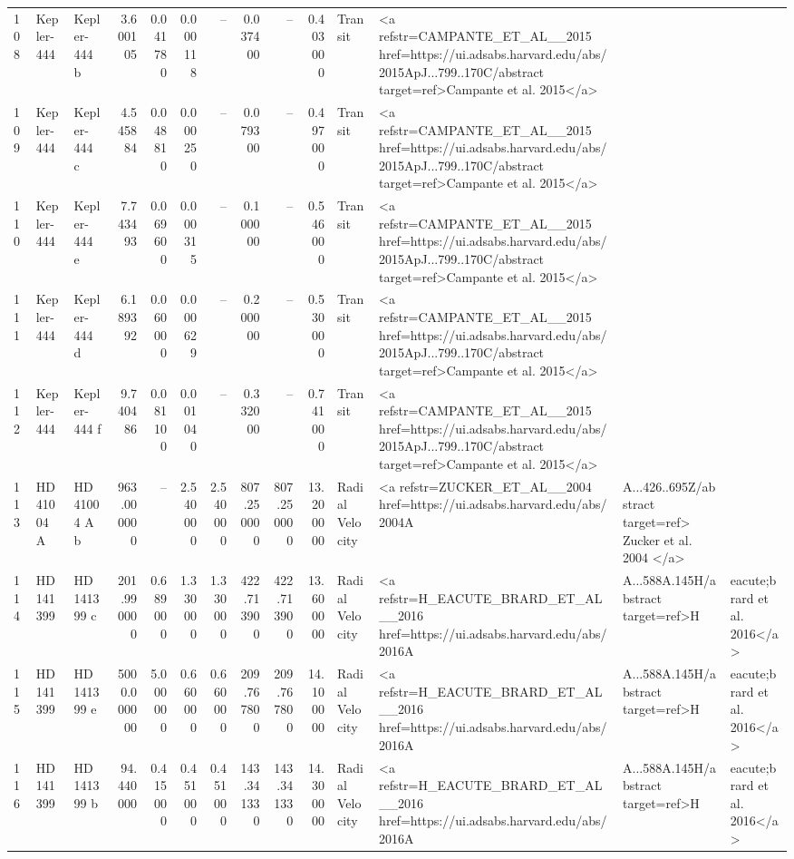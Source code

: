 \begin{tabular}{lllrrrrrrrll}
108 & Kepler-444 & Kepler-444 b & 3.600105 & 0.041780 & 0.000118 & -- & 0.037400 & -- & 0.403000 & Transit & <a refstr=CAMPANTE_ET_AL__2015 href=https://ui.adsabs.harvard.edu/abs/2015ApJ...799..170C/abstract target=ref>Campante et al. 2015</a> \\
109 & Kepler-444 & Kepler-444 c & 4.545884 & 0.048810 & 0.000250 & -- & 0.079300 & -- & 0.497000 & Transit & <a refstr=CAMPANTE_ET_AL__2015 href=https://ui.adsabs.harvard.edu/abs/2015ApJ...799..170C/abstract target=ref>Campante et al. 2015</a> \\
110 & Kepler-444 & Kepler-444 e & 7.743493 & 0.069600 & 0.000315 & -- & 0.100000 & -- & 0.546000 & Transit & <a refstr=CAMPANTE_ET_AL__2015 href=https://ui.adsabs.harvard.edu/abs/2015ApJ...799..170C/abstract target=ref>Campante et al. 2015</a> \\
111 & Kepler-444 & Kepler-444 d & 6.189392 & 0.060000 & 0.000629 & -- & 0.200000 & -- & 0.530000 & Transit & <a refstr=CAMPANTE_ET_AL__2015 href=https://ui.adsabs.harvard.edu/abs/2015ApJ...799..170C/abstract target=ref>Campante et al. 2015</a> \\
112 & Kepler-444 & Kepler-444 f & 9.740486 & 0.081100 & 0.001040 & -- & 0.332000 & -- & 0.741000 & Transit & <a refstr=CAMPANTE_ET_AL__2015 href=https://ui.adsabs.harvard.edu/abs/2015ApJ...799..170C/abstract target=ref>Campante et al. 2015</a> \\
113 & HD 41004 A & HD 41004 A b & 963.000000 & -- & 2.540000 & 2.540000 & 807.250000 & 807.250000 & 13.200000 & Radial Velocity & <a refstr=ZUCKER_ET_AL__2004 href=https://ui.adsabs.harvard.edu/abs/2004A&A...426..695Z/abstract target=ref> Zucker et al. 2004 </a> \\
114 & HD 141399 & HD 141399 c & 201.990000 & 0.689000 & 1.330000 & 1.330000 & 422.713900 & 422.713900 & 13.600000 & Radial Velocity & <a refstr=H_EACUTE_BRARD_ET_AL__2016 href=https://ui.adsabs.harvard.edu/abs/2016A&A...588A.145H/abstract target=ref>H&eacute;brard et al. 2016</a> \\
115 & HD 141399 & HD 141399 e & 5000.000000 & 5.000000 & 0.660000 & 0.660000 & 209.767800 & 209.767800 & 14.100000 & Radial Velocity & <a refstr=H_EACUTE_BRARD_ET_AL__2016 href=https://ui.adsabs.harvard.edu/abs/2016A&A...588A.145H/abstract target=ref>H&eacute;brard et al. 2016</a> \\
116 & HD 141399 & HD 141399 b & 94.440000 & 0.415000 & 0.451000 & 0.451000 & 143.341330 & 143.341330 & 14.300000 & Radial Velocity & <a refstr=H_EACUTE_BRARD_ET_AL__2016 href=https://ui.adsabs.harvard.edu/abs/2016A&A...588A.145H/abstract target=ref>H&eacute;brard et al. 2016</a> \\

\end{tabular}
